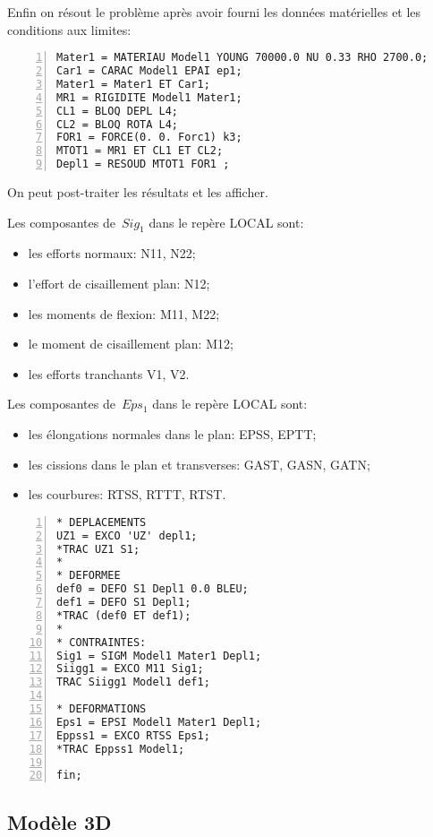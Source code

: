 \medskip
Enfin on résout le problème après avoir fourni les données matérielles et les conditions aux limites:

\begin{Verbatim}[numbers=left,numbersep=3pt,firstnumber=last]
Mater1 = MATERIAU Model1 YOUNG 70000.0 NU 0.33 RHO 2700.0;
Car1 = CARAC Model1 EPAI ep1;
Mater1 = Mater1 ET Car1;
MR1 = RIGIDITE Model1 Mater1;
CL1 = BLOQ DEPL L4;
CL2 = BLOQ ROTA L4;
FOR1 = FORCE(0. 0. Forc1) k3;
MTOT1 = MR1 ET CL1 ET CL2;
Depl1 = RESOUD MTOT1 FOR1 ;
\end{Verbatim}

\medskip
On peut post-traiter les résultats et les afficher.

Les composantes de~$Sig_1$ dans le repère LOCAL sont:
\begin{itemize}
  \item les efforts normaux: N11, N22;
  \item l'effort de cisaillement plan: N12; 
  \item les moments de flexion: M11, M22;
  \item le moment de cisaillement plan: M12;
  \item les efforts tranchants V1, V2.
\end{itemize}

Les composantes de~$Eps_1$ dans le repère LOCAL sont:
\begin{itemize}
  \item les élongations normales dans le plan: EPSS, EPTT;
  \item les cissions dans le plan et transverses: GAST, GASN, GATN;
  \item les courbures: RTSS, RTTT, RTST.
\end{itemize}

\begin{Verbatim}[numbers=left,numbersep=3pt,firstnumber=last]
* DEPLACEMENTS
UZ1 = EXCO 'UZ' depl1;
*TRAC UZ1 S1;
*
* DEFORMEE
def0 = DEFO S1 Depl1 0.0 BLEU;
def1 = DEFO S1 Depl1;
*TRAC (def0 ET def1);
*
* CONTRAINTES: 
Sig1 = SIGM Model1 Mater1 Depl1;
Siigg1 = EXCO M11 Sig1;
TRAC Siigg1 Model1 def1;

* DEFORMATIONS
Eps1 = EPSI Model1 Mater1 Depl1;
Eppss1 = EXCO RTSS Eps1;
*TRAC Eppss1 Model1;

fin;
\end{Verbatim}


\medskip
\subsection{Modèle 3D}


